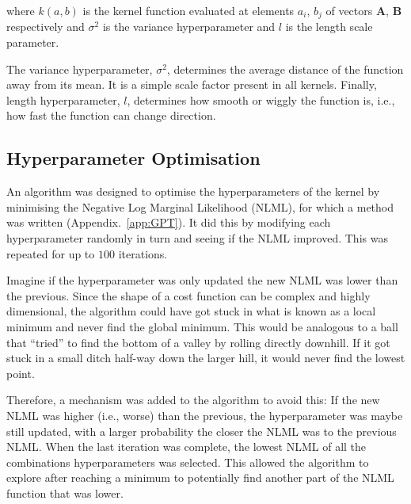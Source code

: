 \documentclass[12pt]{article}
\begin{document}
    \noindent where $k(a,b)$ is the kernel function evaluated at elements $a_i$, $b_j$ of vectors $\mathbf{A}$, $\mathbf{B}$ respectively and $\sigma^2$ is the variance hyperparameter and $l$ is the length scale parameter.

    The variance hyperparameter, $\sigma^2$, determines the average distance of the function away from its mean.
    It is a simple scale factor present in all kernels.
    Finally, length hyperparameter, $l$, determines how smooth or wiggly the function is, i.e., how fast the function can change direction.

    \subsection{Hyperparameter Optimisation}
    An algorithm was designed to optimise the hyperparameters of the kernel by minimising the Negative Log Marginal Likelihood (NLML), for which a method was written (Appendix.~\ref{app:GPT}).
    It did this by modifying each hyperparameter randomly in turn and seeing if the NLML improved.
    This was repeated for up to $100$ iterations.

    Imagine if the hyperparameter was only updated the new NLML was lower than the previous.
    Since the shape of a cost function can be complex and highly dimensional, the algorithm could have got stuck in what is known as a local minimum and never find the global minimum.
    This would be analogous to a ball that ``tried'' to find the bottom of a valley by rolling directly downhill.
    If it got stuck in a small ditch half-way down the larger hill, it would never find the lowest point.

    Therefore, a mechanism was added to the algorithm to avoid this:
    If the new NLML was higher (i.e., worse) than the previous, the hyperparameter was maybe still updated, with a larger probability the closer the NLML was to the previous NLML\@.
    When the last iteration was complete, the lowest NLML of all the combinations hyperparameters was selected.
    This allowed the algorithm to explore after reaching a minimum to potentially find another part of the NLML function that was lower.
\end{document}
